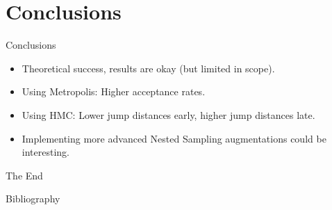 \documentclass[]{beamer}
\begin{document}
  \section{Conclusions}
  \begin{frame}{Conclusions}
    \begin{itemize}
      \item Theoretical success, results are okay (but limited in scope). \pause
      \item Using Metropolis: Higher acceptance rates. \pause
      \item Using HMC: Lower jump distances early, higher jump distances late. \pause
      \item Implementing more advanced Nested Sampling augmentations could be interesting.
    \end{itemize}
  \end{frame}
  \begin{frame}
    \centering
    \Large
    The End
  \end{frame}
  \begin{frame}[allowframebreaks]{Bibliography}
    \printbibliography
  \end{frame}
\end{document}
